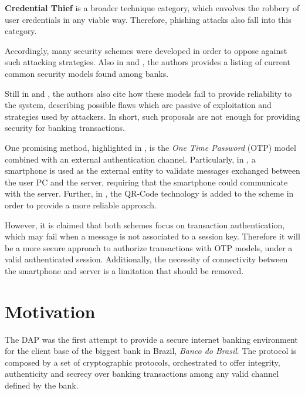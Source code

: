 \textbf{Credential Thief} is a broader technique category, which envolves the robbery of user credentials in any viable way. Therefore, phishing attacks also fall into this category.

Accordingly, many security schemes were developed in order to oppose against such attacking strategies. Also in \cite{peotta-classification} and \cite{attacks-on-internet-banking}, the authors provides a listing of current common security models found among banks.

Still in \cite{peotta-classification} and \cite{attacks-on-internet-banking}, the authors also cite how these models fail to provide reliability to the system, describing possible flaws which are passive of exploitation and strategies used by attackers. In short, such proposals are not enough for providing security for banking transactions.

One promising method, highlighted in \cite[p.61]{bbcode-thesis}, is the \textit{One Time Password} (OTP) model combined with an external authentication channel. Particularly, in \cite{otp-mobile}, a smartphone is used as the external entity to validate messages exchanged between the user PC and the server, requiring that the smartphone could communicate with the server. Further, in \cite{otp-qrcode}, the QR-Code technology is added to the scheme in order to provide a more reliable approach.

However, it is claimed that both schemes focus on transaction authentication, which may fail when a message is not associated to a session key. Therefore it will be a more secure approach to authorize transactions with OTP models, under a valid authenticated session. Additionally, the necessity of connectivity between the smartphone and server is a limitation that should be removed.














\section{Motivation}
The DAP was the first attempt to provide a secure internet banking environment for the client base of the biggest bank in Brazil, \textit{Banco do Brasil}. The protocol is composed by a set of cryptographic protocols, orchestrated to offer integrity, authenticity and secrecy over banking transactions among any valid channel defined by the bank.

